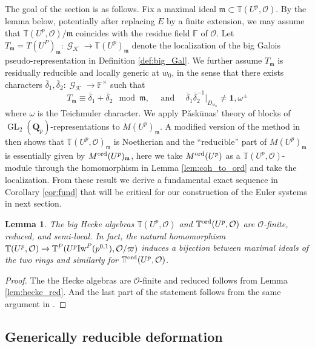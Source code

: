 \documentclass[leqno]{amsart}
\newtheorem{lem}[thm]{Lemma}
\theoremstyle{definition}
\theoremstyle{remark}
\newcommand{\id}{\mathbf{1}}
\newcommand{\oo}{\mathcal{O}}
\newcommand{\fF}{\mathbb{F}} %
\newcommand{\Qp}{\mathbf{Q}_p}
\DeclareMathOperator{\GL}{GL}
\DeclareMathOperator{\Gal}{\mathcal{G}}
\newcommand{\fm}{\mathfrak{m}}
\newcommand{\K}{{\mathcal{K}}} %
\newcommand{\Iw}{\textnormal{Iw}} %
\newcommand{\TT}{\mathbb{T}} %
\newcommand{\ord}{\textnormal{ord}} %
\begin{document}
The goal of the section is as follows.
Fix a maximal ideal $\fm\subset \TT(U^p,\oo)$.
By the lemma below,
potentially after replacing $E$ by a finite extension,
we may assume that 
$\TT(U^p,\oo)/\fm$ coincides with the residue field $\fF$ of $\oo$.
Let $T_{\fm}=T(U^P)_{\fm}\colon \Gal_\K\to \TT(U^p)_{\fm}$
denote the localization of 
the big Galois pseudo-representation in 
Definition \ref{def:big_Gal}.
We further assume  $T_{\fm}$ is 
residually reducible and locally generic at $w_0$,
in the sense that there exists characters
$\bar{\delta}_1, \bar{\delta}_2\colon \Gal_{\K}\to \fF^\times$
such that 
\begin{equation}\tag{red.gen}\label{cond:red_gen}
	T_\fm\equiv \bar{\delta}_1+\bar{\delta}_2
	\mod \fm,\quad
    \text{ and }\quad
	\bar{\delta}_1\bar{\delta}_2^{-1} \vert_{D_{w_0}}
	\neq \id,\omega^{\pm}
\end{equation}
where $\omega$ is the Teichmuler character.
We apply P\v{a}sk\={u}nas' theory of blocks
of $\GL_2(\Qp)$-representations
to $M(U^p)_{\fm}$.
A modified version of the method in \cite{urban}
then shows that $\TT(U^p,\oo)_{\fm}$ is Noetherian
and the ``reducible'' part of  $M(U^p)_{\fm}$
is essentially given by $M^{\ord}(U^p)_{\fm}$,
here we take $M^{\ord}(U^p)$
as a $\TT(U^p,\oo)$-module 
through the homomorphism in Lemma \ref{lem:coh_to_ord}
and take the localization.
From these result we derive a fundamental exact sequence
in Corollary \ref{cor:fund} that will be critical
for our construction of the Euler systems in next section.


\begin{lem}
The big Hecke algebras 
$\TT(U^p,\oo)$ and $\TT^{\ord}(U^p,\oo)$
are $\oo$-finite, reduced, and semi-local.
In fact, the natural homomorphism
$\TT(U^p,\oo)\to \TT^P(U^p\Iw^P(p^{0,1}),\oo/\varpi)$ 
induces a bijection between maximal ideals of the two rings
and similarly for $\TT^{\ord}(U^p,\oo)$.
\end{lem}
\begin{proof}
The the Hecke algebras are $\oo$-finite and reduced
follows from Lemma \ref{lem:hecke_red}.
And the last part of the statement
follows from the same argument
in \cite[Prop 3.3.6]{pan}.
\end{proof}







\subsection{Generically reducible deformation}
\end{document}
